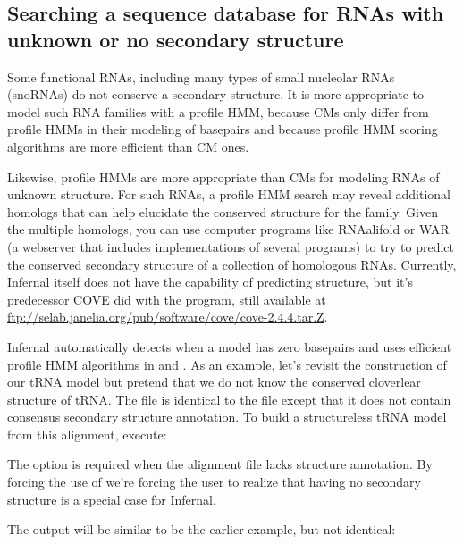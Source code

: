 \subsection{Searching a sequence database for RNAs with unknown or no
 secondary structure}

Some functional RNAs, including many types of small nucleolar RNAs
(snoRNAs) do not conserve a secondary structure. It is more
appropriate to model such RNA families with a profile HMM, because CMs
only differ from profile HMMs in their modeling of basepairs and
because profile HMM scoring algorithms are more efficient than CM
ones. 

Likewise, profile HMMs are more appropriate than CMs for modeling RNAs
of unknown structure. For such RNAs, a profile HMM search may reveal
additional homologs that can help elucidate the conserved structure
for the family. Given the multiple homologs, you can use computer
programs like RNAalifold \cite{} or WAR \cite{Torarinsson08} (a
webserver that includes implementations of several programs) to try to
predict the conserved secondary structure of a collection of
homologous RNAs. Currently, Infernal itself does not have the
capability of predicting structure, but it's predecessor COVE did with
the  program, still available at
\url{ftp://selab.janelia.org/pub/software/cove/cove-2.4.4.tar.Z}.

Infernal automatically detects when a model has zero basepairs and
uses efficient profile HMM algorithms in  and
. As an example, let's revisit the construction of our
tRNA model but pretend that we do not know the conserved cloverlear
structure of tRNA.
The file 
 is identical to the file 
 except that it does not contain consensus
secondary structure annotation. 
To build a structureless tRNA model from this alignment, execute:


The  option is required when the alignment file lacks
structure annotation. By forcing the use of  we're
forcing the user to realize that having no secondary structure is a
special case for Infernal.

The output will be similar to be the earlier example, but not
identical:

